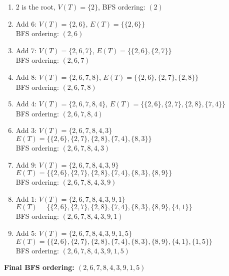 \documentclass{article}
\theoremstyle{definition}
\begin{document}
\begin{enumerate}
\item $2$ is the root, $V(T) = \{2\}$, BFS ordering: $(2)$

\item Add $6$: $V(T) = \{2, 6\}$, $E(T) = \{\{2, 6\}\}$\\
   BFS ordering: $(2, 6)$
   
\item Add $7$: $V(T) = \{2, 6, 7\}$, $E(T) = \{\{2, 6\}, \{2, 7\}\}$\\
   BFS ordering: $(2, 6, 7)$
   
\item Add $8$: $V(T) = \{2, 6, 7, 8\}$, $E(T) = \{\{2, 6\}, \{2, 7\}, \{2, 8\}\}$\\
   BFS ordering: $(2, 6, 7, 8)$
   
\item Add $4$: $V(T) = \{2, 6, 7, 8, 4\}$, $E(T) = \{\{2, 6\}, \{2, 7\}, \{2, 8\}, \{7, 4\}\}$\\
   BFS ordering: $(2, 6, 7, 8, 4)$
   
\item Add $3$: $V(T) = \{2, 6, 7, 8, 4, 3\}$\\
   $E(T) = \{\{2, 6\}, \{2, 7\}, \{2, 8\}, \{7, 4\}, \{8, 3\}\}$\\
   BFS ordering: $(2, 6, 7, 8, 4, 3)$
   
\item Add $9$: $V(T) = \{2, 6, 7, 8, 4, 3, 9\}$\\
   $E(T) = \{\{2, 6\}, \{2, 7\}, \{2, 8\}, \{7, 4\}, \{8, 3\}, \{8, 9\}\}$\\
   BFS ordering: $(2, 6, 7, 8, 4, 3, 9)$
   
\item Add $1$: $V(T) = \{2, 6, 7, 8, 4, 3, 9, 1\}$\\
   $E(T) = \{\{2, 6\}, \{2, 7\}, \{2, 8\}, \{7, 4\}, \{8, 3\}, \{8, 9\}, \{4, 1\}\}$\\
   BFS ordering: $(2, 6, 7, 8, 4, 3, 9, 1)$
   
\item Add $5$: $V(T) = \{2, 6, 7, 8, 4, 3, 9, 1, 5\}$\\
   $E(T) = \{\{2, 6\}, \{2, 7\}, \{2, 8\}, \{7, 4\}, \{8, 3\}, \{8, 9\}, \{4, 1\}, \{1, 5\}\}$\\
   BFS ordering: $(2, 6, 7, 8, 4, 3, 9, 1, 5)$
\end{enumerate}

\textbf {Final BFS ordering: $(2, 6, 7, 8, 4, 3, 9, 1, 5)$}
\end{document}
